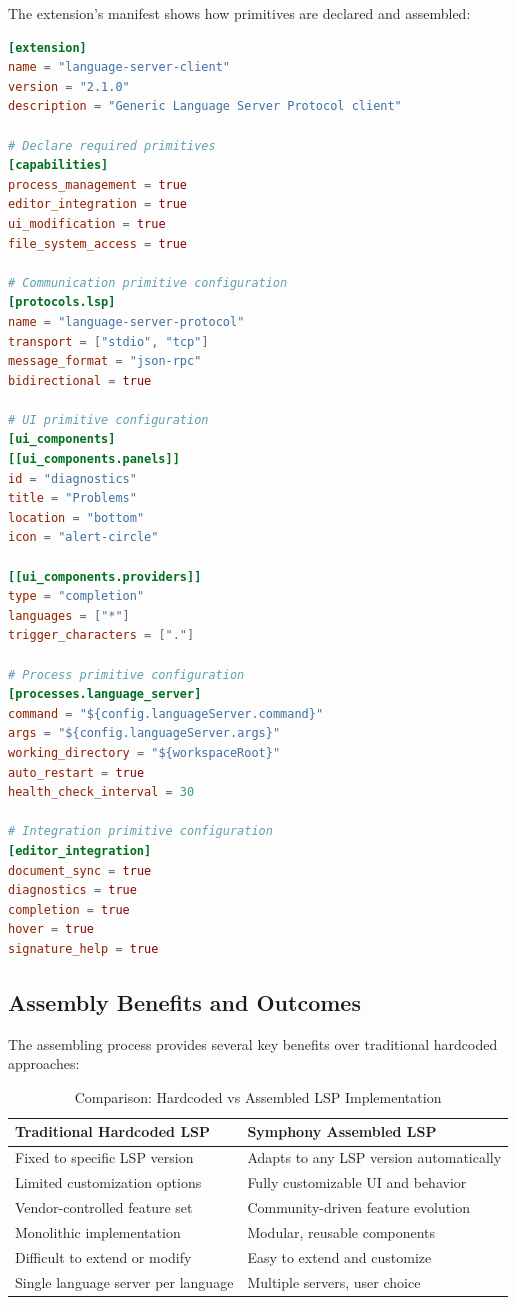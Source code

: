 The extension's manifest shows how primitives are declared and assembled:

\begin{lstlisting}[language=toml, caption=LSP Extension Manifest]
[extension]
name = "language-server-client"
version = "2.1.0"
description = "Generic Language Server Protocol client"

# Declare required primitives
[capabilities]
process_management = true
editor_integration = true
ui_modification = true
file_system_access = true

# Communication primitive configuration
[protocols.lsp]
name = "language-server-protocol"
transport = ["stdio", "tcp"]
message_format = "json-rpc"
bidirectional = true

# UI primitive configuration
[ui_components]
[[ui_components.panels]]
id = "diagnostics"
title = "Problems"
location = "bottom"
icon = "alert-circle"

[[ui_components.providers]]
type = "completion"
languages = ["*"]
trigger_characters = ["."]

# Process primitive configuration
[processes.language_server]
command = "${config.languageServer.command}"
args = "${config.languageServer.args}"
working_directory = "${workspaceRoot}"
auto_restart = true
health_check_interval = 30

# Integration primitive configuration
[editor_integration]
document_sync = true
diagnostics = true
completion = true
hover = true
signature_help = true
\end{lstlisting}

\subsection*{Assembly Benefits and Outcomes}

The assembling process provides several key benefits over traditional hardcoded approaches:

\begin{table}[ht]
\centering
\begin{tabular}{@{}p{}p{}@{}}
\toprule
\textbf{Traditional Hardcoded LSP} & \textbf{Symphony Assembled LSP} \\
\midrule
Fixed to specific LSP version & Adapts to any LSP version automatically \\
Limited customization options & Fully customizable UI and behavior \\
Vendor-controlled feature set & Community-driven feature evolution \\
Monolithic implementation & Modular, reusable components \\
Difficult to extend or modify & Easy to extend and customize \\
Single language server per language & Multiple servers, user choice \\
\bottomrule
\end{tabular}
\caption{Comparison: Hardcoded vs Assembled LSP Implementation}
\end{table}

